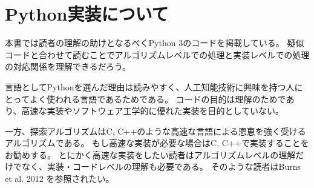 \section{Python実装について}

本書では読者の理解の助けとなるべくPython 3のコードを掲載している。
疑似コードと合わせて読むことでアルゴリズムレベルでの処理と実装レベルでの処理の対応関係を理解できるだろう。

言語としてPythonを選んだ理由は読みやすく、人工知能技術に興味を持つ人にとってよく使われる言語であるためである。
コードの目的は理解のためであり、高速な実装やソフトウェア工学的に優れた実装を目的としていない。

一方、探索アルゴリズムはC, C++のような高速な言語による恩恵を強く受けるアルゴリズムである。
もし高速な実装が必要な場合はC, C++で実装することをお勧めする。
とにかく高速な実装をしたい読者はアルゴリズムレベルの理解だけでなく、実装・コードレベルの理解も必要である。
そのような読者はBurns et al. 2012 \cite{burns2012implementing}を参照されたい。
